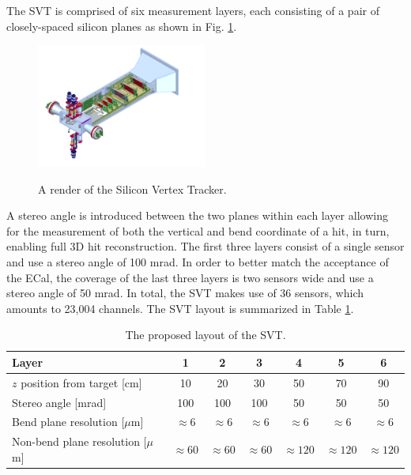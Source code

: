 The SVT is comprised of six measurement layers, each consisting of a pair of
closely-spaced silicon planes as shown in Fig. \ref{fig:svt_layout_render}.
\begin{figure}[h]
    \centering
    \caption{A render of the Silicon Vertex Tracker.}
    \includegraphics[width=0.5\textwidth]{images/svt_layout_render.png}
    \label{fig:svt_layout_render}
\end{figure}
A stereo angle is introduced between the two planes within each layer allowing
for the measurement of both the vertical and bend coordinate of a hit, in turn, 
enabling full 3D hit reconstruction.  The first three layers consist of a
single sensor and use a stereo angle of 100 mrad. In order to better match the
acceptance of the ECal, the coverage of the last three layers is two sensors 
wide and use a stereo angle of 50 mrad.  In total, the SVT makes use of 36
sensors, which amounts to 23,004 channels.  The SVT layout is summarized in 
Table \ref{tab:svt_layout}.

\begin{table}[t]
 \begin{center}
\begin{tabular}{l|cccccc}  
Layer & 1 & 2 & 3 & 4 & 5 & 6 \\ \hline
$z$ position from target [cm]    & 10 & 20 & 30 & 50 & 70 & 90 \\
Stereo angle [mrad] & 100 & 100 & 100 & 50 & 50 & 50 \\
Bend plane resolution [$\mu$m] & $\approx$6 & $\approx$6 & $\approx$6
& $\approx$6 & $\approx$6 & $\approx$6 \\
Non-bend plane resolution [$\mu$m] & $\approx60$ & $\approx60$ & $\approx60$
& $\approx120$ & $\approx120$ & $\approx120$ \\
\hline
\end{tabular}
\caption{The proposed layout of the SVT.}
\label{tab:svt_layout}
\end{center}
\end{table}



